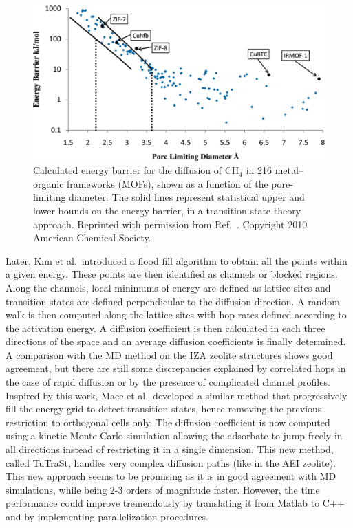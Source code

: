 \documentclass[main.tex]{subfiles}
\begin{document}
\begin{figure}[ht]
\centering
  \includegraphics[width=0.7\linewidth]{figures/1-screening/Haldoupis_2010.jpeg}
  \caption{Calculated energy barrier for the diffusion of CH$_4$ in 216 metal--organic frameworks (MOFs), shown as a function of the pore-limiting diameter. The solid lines represent statistical upper and lower bounds on the energy barrier, in a transition state theory approach. Reprinted with permission from Ref.~. Copyright 2010 American Chemical Society.}
  \label{fgr:Haldoupis_2010}
\end{figure}

Later, Kim et al.\ introduced a flood fill algorithm to obtain all the points within a given energy.\cite{Kim_2013} These points are then identified as channels or blocked regions. Along the channels, local minimums of energy are defined as lattice sites and transition states are defined perpendicular to the diffusion direction. A random walk is then computed along the lattice sites with hop-rates defined according to the activation energy. A diffusion coefficient is then calculated in each three directions of the space and an average diffusion coefficients is finally determined.
A comparison with the MD method on the IZA zeolite structures shows good agreement, but there are still some discrepancies explained by correlated hops in the case of rapid diffusion or by the presence of complicated channel profiles. Inspired by this work, Mace et al.\ developed a similar method that progressively fill the energy grid to detect transition states, hence removing the previous restriction to orthogonal cells only.\cite{Mace_2019} The diffusion coefficient is now computed using a kinetic Monte Carlo simulation allowing the adsorbate to jump freely in all directions instead of restricting it in a single dimension. This new method, called TuTraSt, handles very complex diffusion paths (like in the AEI zeolite). This new approach seems to be promising as it is in good agreement with MD simulations, while being 2-3 orders of magnitude faster. However, the time performance could improve tremendously by translating it from Matlab to C++ and by implementing parallelization procedures.
\end{document}
